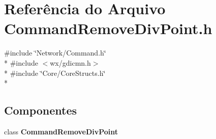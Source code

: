 \section{Referência do Arquivo Command\+Remove\+Div\+Point.\+h}
\label{_command_remove_div_point_8h}
{\ttfamily \#include \char`\"{}Network/\+Command.\+h\char`\"{}}\\*
{\ttfamily \#include $<$wx/gdicmn.\+h$>$}\\*
{\ttfamily \#include \char`\"{}Core/\+Core\+Structs.\+h\char`\"{}}\\*
\subsection*{Componentes}
\begin{DoxyCompactItemize}
\item 
class {\bf Command\+Remove\+Div\+Point}
\end{DoxyCompactItemize}
